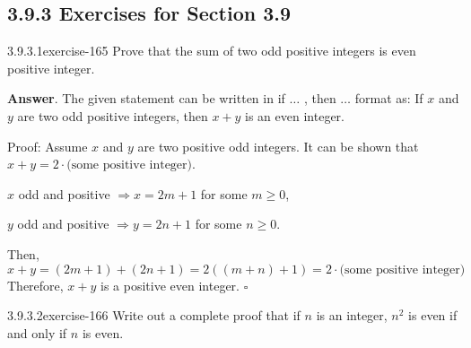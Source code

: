 \documentclass[twoside,10pt,]{book}
\numberwithin{equation}{section}
\begin{document}
\subsection*{3.9.3 Exercises for Section 3.9}
\begin{divisionsolution}{3.9.3.1}{}{exercise-165}%
\hypertarget{p-1489}{}%
Prove that the sum of two odd positive integers is even positive integer.%
\par\smallskip%
\noindent\textbf{Answer}.\quad%
\hypertarget{p-1490}{}%
The given statement can be written in if \(\dots\) , then \(\dots\) format as: If \(x\) and \(y\) are two odd positive integers, then \(x+y\) is an even integer.%
\par
\hypertarget{p-1491}{}%
Proof: Assume \(x\) and \(y\) are two positive odd integers. It can be shown that \(x+y=2 \cdot \textrm{(some positive integer)}\).%
\par
\hypertarget{p-1492}{}%
\(x\) odd and positive \(\Rightarrow x=2m+1\) for some \(m \geq 0\),%
\par
\hypertarget{p-1493}{}%
\(y\) odd and positive \(\Rightarrow y=2n+1\) for some \(n \geq 0\).%
\par
\hypertarget{p-1494}{}%
Then,%
\begin{equation*}
x+y=(2m+1)+(2n+1)=2((m+n)+1)=2\cdot\textrm{(some positive integer)}
\end{equation*}
Therefore, \(x+y\) is a positive even integer. \(\square\)%
\end{divisionsolution}%
\begin{divisionsolution}{3.9.3.2}{}{exercise-166}%
\hypertarget{p-1495}{}%
Write out a complete proof that if \(n\) is an integer, \(n^2\) is even if and only if \(n\) is even.%
\end{divisionsolution}%
\end{document}
